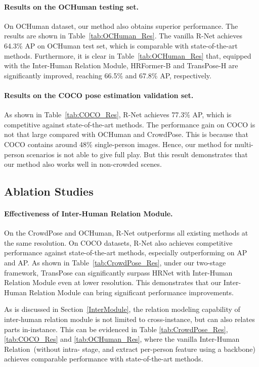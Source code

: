 \documentclass{article}
\begin{document}
\paragraph{Results on the OCHuman testing set.}
On OCHuman dataset, our method also obtains superior performance. The results are shown in Table~\ref{tab:OCHuman_Res}. The vanilla R-Net achieves 64.3\% AP on OCHuman test set, which is comparable with state-of-the-art methods. Furthermore, it is clear in Table~\ref{tab:OCHuman_Res} that, equipped with the Inter-Human Relation Module, HRFormer-B and TransPose-H are significantly improved, reaching 66.5\% and 67.8\% AP, respectively. 


\paragraph{Results on the COCO pose estimation validation set.} As shown in Table~\ref{tab:COCO_Res}, R-Net achieves 77.3\% AP, which is competitive against state-of-the-art methods. The performance gain on COCO is not that large compared with OCHuman and CrowdPose. This is because that COCO contains around 48\% single-person images. Hence, our method for multi-person scenarios is not able to give full play. But this result demonstrates that our method also works well in non-crowded scenes.









    


\subsection{Ablation Studies}

\paragraph{Effectiveness of Inter-Human Relation Module.} 
On the CrowdPose and OCHuman, R-Net outperforms all existing methods at the same resolution. On COCO datasets, R-Net also achieves competitive performance against state-of-the-art methods, especially outperforming on AP and AP. As shown in Table~\ref{tab:CrowdPose_Res}, under our two-stage framework, TransPose can significantly surpass HRNet with Inter-Human Relation Module even at lower resolution. This demonstrates that our Inter-Human Relation Module can bring significant performance improvements.

As is discussed in Section~\ref{InterModule}, the relation modeling capability of inter-human relation module is not limited to cross-instance, but can also relates parts in-instance. This can be evidenced in Table \ref{tab:CrowdPose_Res}, \ref{tab:COCO_Res} and \ref{tab:OCHuman_Res}, where the vanilla Inter-Human Relation~(without intra- stage, and extract per-person feature using a backbone) achieves comparable performance with state-of-the-art methods.
\end{document}
